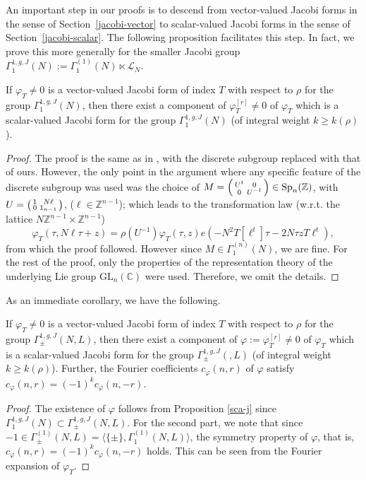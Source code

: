 \documentclass[11pt]{amsart}
\numberwithin{equation}{section}
\newcommand{\mbb}{\mathbb}
\newcommand{\mc}{\mathcal}
\newcommand{\mrm}{\mathrm} %
\newcommand{\lan}{\langle}
\newcommand{\ran}{\rangle}
\newcommand{\z}{\mathbb{Z}}
\newcommand{\glnc}{\mrm{GL}_n(\mbb C)}
\newcommand{\spnz}{\mrm{Sp}_n(\mbb Z)}
\begin{document}
An important step in our proofs is to descend from vector-valued Jacobi forms in the sense of Section~\ref{jacobi-vector} to scalar-valued Jacobi forms in the sense of Section~\ref{jacobi-scalar}. The following proposition facilitates this step. In fact, we prove this more generally for the smaller Jacobi group $\Gamma_1^{1,g,J}(N):=\Gamma_1^{(1)}(N)\ltimes \mc L_N$.
\begin{proposition} \label{sca-j}
If $\varphi_T \neq 0$ is a vector-valued Jacobi form of index $T$ with respect to $\rho$ for the group $\Gamma_1^{1,g,J}(N)$, then there exist a component of $\varphi^{[r]}_T \neq 0$ of $\varphi_T$ which is a scalar-valued Jacobi form for the group $\Gamma^{1,g,J}_1(N)$ (of integral weight $k \geq k(\rho)$).
\end{proposition}

\begin{proof}
  The proof is the same as in   \cite[Proposition 3.4]{boche-das}, with the discrete subgroup replaced with that of ours. However, the only point in the argument where any specific feature of the discrete subgroup was used was the choice of 
  $M=\begin{psmallmatrix} 
  U^t & 0\\
0 & U^{-1}\end{psmallmatrix} \in \spnz $, with $U=\begin{psmallmatrix} 1 & N\ell\\
0 & 1_{n-1}
\end{psmallmatrix}$,  ($\ell \in \z^{n-1}$);
which leads to the transformation law (w.r.t. the lattice $N \z^{n-1} \times \z^{n-1}$)
\begin{equation}
\varphi_T(\tau,N\ell\tau+z)=\rho(U^{-1})\varphi_T(\tau,z)
e\left(-N^2T[\ell^t]\tau -2N\tau z T\ell^t\right) , \label{Lie}
\end{equation}
from which the proof followed. However since $M \in \Gamma^{(n)}_1 (N)$, we are fine.
For the rest of the proof, only the properties of the representation theory of the underlying Lie group $\glnc$ were used. Therefore, we omit the details.
\end{proof}
As an immediate corollary, we have the following.
\begin{corollary}
  If $\varphi_T \neq 0$ is a vector-valued Jacobi form of index $T$ with respect to $\rho$ for the group $\Gamma_\pm^{1,g, J}(N,L)$, then there exist a component of $\varphi:=\varphi^{[r]}_T \neq 0$ of $\varphi_T$ which is a scalar-valued Jacobi form for the group $\Gamma^{1,g,J}_\pm(,L)$ (of integral weight $k \geq k(\rho)$). Further, the Fourier coefficients $c_\varphi(n,r)$ of $\varphi$ satisfy $c_\varphi(n,r)= (-1)^{k}c_\varphi(n,-r)$.
\end{corollary}
\begin{proof}
    The existence of $\varphi$ follows from Proposition \ref{sca-j} since $\Gamma_1^{1,g,J}(N)\subset\Gamma_\pm^{1,g, J}(N,L)$.  For the second part, we note that since $-1 \in \Gamma^{(1)}_\pm(N, L)= \big \lan \{ \pm \}, \Gamma_1^{(1)} (N, L)\big \ran$, the symmetry property of $\varphi$, that is, $c_\varphi(n,r)= (-1)^{k}c_\varphi(n,-r)$ holds. This can be seen from the Fourier expansion of $\varphi_T$. 
\end{proof}
\end{document}
